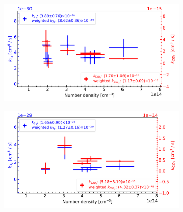 \begin{figure}[!htb]

    \centering

    \begin{subfigure}[b]{0.49\textwidth}
        \centering
        \includegraphics[width=1\textwidth]{figures/measurements/kinetics/rate-constants-higher-order/off_4.8K_k3_kCID_2_as_functionOfnHe.pdf}
        \caption{}
        
    \end{subfigure}
    \hfill
    \begin{subfigure}[b]{0.49\textwidth}
        \centering
        \includegraphics[width=1\textwidth]{figures/measurements/kinetics/rate-constants-higher-order/off_4.8K_k3_kCID_3_as_functionOfnHe.pdf}
        \caption{}
        
    \end{subfigure}
    

\end{figure}
